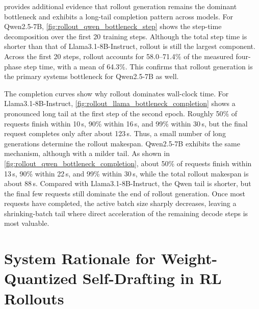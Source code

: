 \documentclass{llmxive}
\begin{document}
 provides additional evidence that rollout generation remains the dominant bottleneck and exhibits a long-tail completion pattern across models.
For Qwen2.5-7B, \cref{fig:rollout_qwen_bottleneck_step} shows the step-time decomposition over the first 20 training steps.
Although the total step time is shorter than that of Llama3.1-8B-Instruct, rollout is still the largest component.
Across the first 20 steps, rollout accounts for 58.0--71.4\% of the measured four-phase step time, with a mean of 64.3\%.
This confirms that rollout generation is the primary systems bottleneck for Qwen2.5-7B as well.

The completion curves show why rollout dominates wall-clock time.
For Llama3.1-8B-Instruct, \cref{fig:rollout_llama_bottleneck_completion} shows a pronounced long tail at the first step of the second epoch.
Roughly 50\% of requests finish within 10\,s, 90\% within 16\,s, and 99\% within 30\,s, but the final request completes only after about 123\,s.
Thus, a small number of long generations determine the rollout makespan.
Qwen2.5-7B exhibits the same mechanism, although with a milder tail.
As shown in \cref{fig:rollout_qwen_bottleneck_completion}, about 50\% of requests finish within 13\,s, 90\% within 22\,s, and 99\% within 30\,s, while the total rollout makespan is about 88\,s.
Compared with Llama3.1-8B-Instruct, the Qwen tail is shorter, but the final few requests still dominate the end of rollout generation.
Once most requests have completed, the active batch size sharply decreases, leaving a shrinking-batch tail where direct acceleration of the remaining decode steps is most valuable.


\section{System Rationale for Weight-Quantized Self-Drafting in RL Rollouts}
\label{app:why_quantized_sd}
\end{document}
